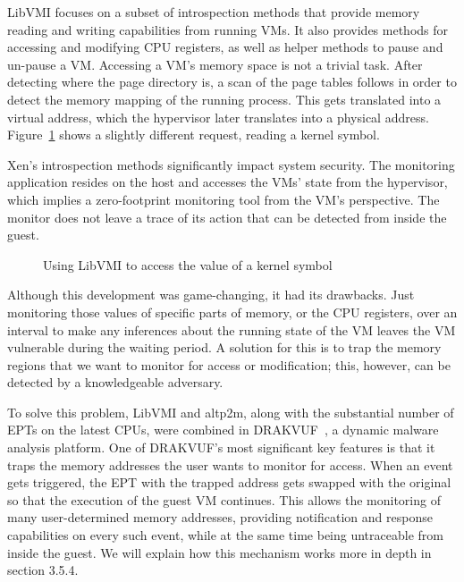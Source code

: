 \par LibVMI focuses on a subset of introspection methods that provide memory reading and writing capabilities from running \ac{VM}s. It also provides methods for accessing and modifying \ac{CPU} registers, as well as helper methods to pause and un-pause a \ac{VM}. Accessing a \ac{VM}'s memory space is not a trivial task. After detecting where the page directory is, a scan of the page tables follows in order to detect the memory mapping of the running process. This gets translated into a virtual address, which the hypervisor later translates into a physical address. Figure~\ref{fig:accesskernel} shows a slightly different request, reading a kernel symbol.

\par Xen’s introspection methods significantly impact system security. The monitoring application resides on the host and accesses the \ac{VM}s' state from the hypervisor, which implies a zero-footprint monitoring tool from the \ac{VM}'s perspective. The monitor does not leave a trace of its action that can be detected from inside the guest.

\begin{figure}[ht]
	\centering
	
	\caption{Using LibVMI to access the value of a kernel symbol}
	\label{fig:accesskernel}
\end{figure}

\par Although this development was game-changing, it had its drawbacks. Just monitoring those values of specific parts of memory, or the \ac{CPU} registers, over an interval to make any inferences about the running state of the \ac{VM} leaves the \ac{VM} vulnerable during the waiting period. A solution for this is to trap the memory regions that we want to monitor for access or modification; this, however, can be detected by a knowledgeable adversary. 

\par To solve this problem, LibVMI and altp2m, along with the substantial number of \ac{EPT}s on the latest \ac{CPU}s, were combined in DRAKVUF~\cite{lengyel2014drakvuf}, a dynamic malware analysis platform. One of DRAKVUF's most significant key features is that it traps the memory addresses the user wants to monitor for access. When an event gets triggered, the \ac{EPT} with the trapped address gets swapped with the original so that the execution of the guest \ac{VM} continues. This allows the monitoring of many user-determined memory addresses, providing notification and response capabilities on every such event, while at the same time being untraceable from inside the guest. We will explain how this mechanism works more in depth in section 3.5.4.


